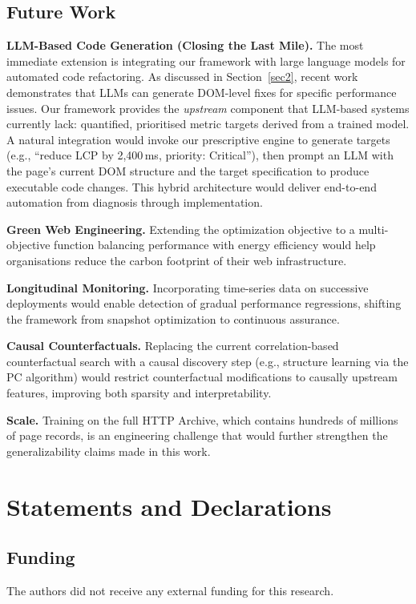 \documentclass[sn-nature]{sn-jnl}
\begin{document}
\subsection{Future Work}

\textbf{LLM-Based Code Generation (Closing the Last Mile).} The most immediate extension is integrating our framework with large language models for automated code refactoring. As discussed in Section~\ref{sec2}, recent work~\cite{burg2026} demonstrates that LLMs can generate DOM-level fixes for specific performance issues. Our framework provides the \textit{upstream} component that LLM-based systems currently lack: quantified, prioritised metric targets derived from a trained model. A natural integration would invoke our prescriptive engine to generate targets (e.g., ``reduce LCP by 2,400\,ms, priority: Critical''), then prompt an LLM with the page's current DOM structure and the target specification to produce executable code changes. This hybrid architecture would deliver end-to-end automation from diagnosis through implementation.

\textbf{Green Web Engineering.} Extending the optimization objective to a multi-objective function balancing performance with energy efficiency would help organisations reduce the carbon footprint of their web infrastructure.

\textbf{Longitudinal Monitoring.} Incorporating time-series data on successive deployments would enable detection of gradual performance regressions, shifting the framework from snapshot optimization to continuous assurance.

\textbf{Causal Counterfactuals.} Replacing the current correlation-based counterfactual search with a causal discovery step (e.g., structure learning via the PC algorithm) would restrict counterfactual modifications to causally upstream features, improving both sparsity and interpretability.

\textbf{Scale.} Training on the full HTTP Archive, which contains hundreds of millions of page records, is an engineering challenge that would further strengthen the generalizability claims made in this work.


\section*{Statements and Declarations}

\subsection*{Funding}
The authors did not receive any external funding for this research.
\end{document}
